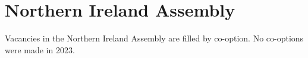 \documentclass[a4paper,openany]{book}
\begin{document}
%
%
%

%
%

\section{Northern Ireland Assembly}

Vacancies in the Northern Ireland Assembly are filled by co-option.
No co-options were made in 2023.
%
\end{document}
